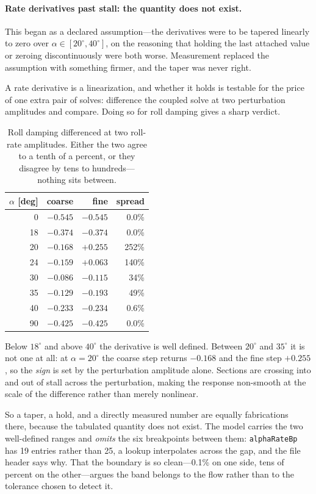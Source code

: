 \documentclass[11pt,a4paper]{article}
\newcommand{\varid}[1]{\texttt{\small #1}}
\newcommand{\dg}{^\circ}
\begin{document}
\paragraph{Rate derivatives past stall: the quantity does not exist.}
\label{sec:ratetaper}
This began as a declared assumption---the derivatives were to be tapered
linearly to zero over $\alpha \in [20\dg, 40\dg]$, on the reasoning that
holding the last attached value or zeroing discontinuously were both
worse. Measurement replaced the assumption with something firmer, and
the taper was never right.

A rate derivative is a linearization, and whether it holds is testable
for the price of one extra pair of solves: difference the coupled solve
at two perturbation amplitudes and compare. Doing so for roll damping
gives a sharp verdict.

\begin{table}[htbp]
\centering
\caption{Roll damping differenced at two roll-rate amplitudes. Either
the two agree to a tenth of a percent, or they disagree by tens to
hundreds---nothing sits between.}
\label{tab:ratelinearity}
\begin{tabular}{@{}rrrr@{}}
\toprule
$\alpha$ [deg] & coarse & fine & spread \\
\midrule
0 & $-0.545$ & $-0.545$ & 0.0\% \\
18 & $-0.374$ & $-0.374$ & 0.0\% \\
20 & $-0.168$ & $+0.255$ & 252\% \\
24 & $-0.159$ & $+0.063$ & 140\% \\
30 & $-0.086$ & $-0.115$ & 34\% \\
35 & $-0.129$ & $-0.193$ & 49\% \\
40 & $-0.233$ & $-0.234$ & 0.6\% \\
90 & $-0.425$ & $-0.425$ & 0.0\% \\
\bottomrule
\end{tabular}
\end{table}

Below $18\dg$ and above $40\dg$ the derivative is well defined. Between
$20\dg$ and $35\dg$ it is not one at all: at $\alpha = 20\dg$ the coarse
step returns $-0.168$ and the fine step $+0.255$, so the \emph{sign} is
set by the perturbation amplitude alone. Sections are crossing into and
out of stall across the perturbation, making the response non-smooth at
the scale of the difference rather than merely nonlinear.

So a taper, a hold, and a directly measured number are equally
fabrications there, because the tabulated quantity does not exist. The
model carries the two well-defined ranges and \emph{omits} the six
breakpoints between them: \varid{alphaRateBp} has 19 entries rather than
25, a lookup interpolates across the gap, and the file header says why.
That the boundary is so clean---0.1\% on one side, tens of percent on
the other---argues the band belongs to the flow rather than to the
tolerance chosen to detect it.
\end{document}
